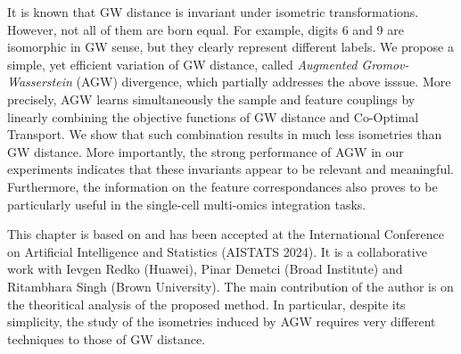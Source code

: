 It is known that GW distance is invariant under isometric transformations. However,
not all of them are born equal. For example, digits 6 and 9 are isomorphic in GW sense,
but they clearly represent different labels. We propose a simple,
yet efficient variation of GW distance, called \textit{Augmented Gromov-Wasserstein} (AGW) divergence,
which partially addresses the above isssue.
More precisely, AGW learns simultaneously the sample and feature couplings by
linearly combining the objective functions of GW distance and Co-Optimal Transport.
We show that such combination results in much less isometries than GW distance.
More importantly, the strong performance of AGW in our experiments indicates
that these invariants appear to be relevant and meaningful.
Furthermore, the information on the feature correspondances also proves to be particularly useful
in the single-cell multi-omics integration tasks.

This chapter is based on \citep{Demetci23} and has been accepted at the
International Conference on Artificial Intelligence and Statistics (AISTATS 2024).
It is a collaborative work with Ievgen Redko (Huawei), Pinar Demetci (Broad Institute)
and Ritambhara Singh (Brown University). The main contribution of the author is on the
theoritical analysis of the proposed method. In particular, despite its simplicity,
the study of the isometries induced by AGW requires very different techniques
to those of GW distance.